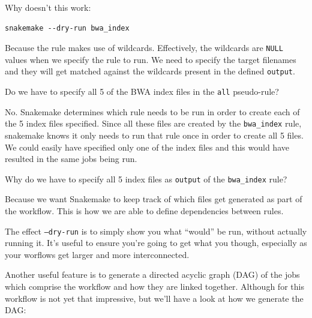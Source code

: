 \begin{questions}

Why doesn't this work:

\begin{lstlisting}
snakemake --dry-run bwa_index
\end{lstlisting}

\begin{answer}

Because the rule makes use of wildcards.
Effectively, the wildcards are \texttt{NULL} values when we specify the rule to run. We need to specify the target filenames and they will get matched against the wildcards present in the defined \texttt{output}.

\end{answer}

Do we have to specify all 5 of the BWA index files in the \texttt{all} pseudo-rule?

\begin{answer}

No.
Snakemake determines which rule needs to be run in order to create each of the 5 index files specified.
Since all these files are created by the \texttt{bwa\_index} rule, snakemake knows it only needs to run that rule once in order to create all 5 files.
We could easily have specified only one of the index files and this would have resulted in the same jobs being run.

\end{answer}

Why do we have to specify all 5 index files as \texttt{output} of the \texttt{bwa\_index} rule?

\begin{answer}

Because we want Snakemake to keep track of which files get generated as part of the workflow.
This is how we are able to define dependencies between rules.

\end{answer}

\end{questions}


The effect \texttt{--dry-run} is to simply show you what ``would'' be run, without actually running it.
It's useful to ensure you're going to get what you though, especially as your worflows get larger and more interconnected.

Another useful feature is to generate a directed acyclic graph (DAG) of the jobs which comprise the workflow and how they are linked together.
Although for this workflow is not yet that impressive, but we'll have a look at how we generate the DAG:

